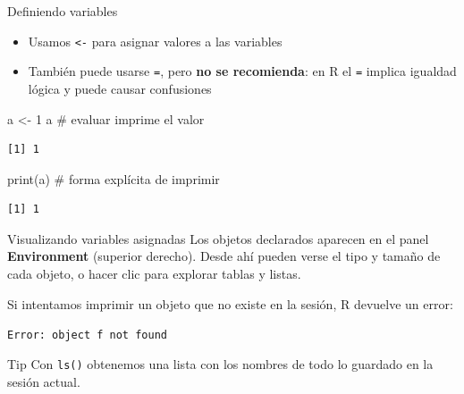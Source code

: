 \documentclass[
  9pt,
  ignorenonframetext,
]{beamer}
\newenvironment{Shaded}{\begin{snugshade}}{\end{snugshade}}
\newcommand{\CommentTok}[1]{\textcolor[rgb]{0.37,0.37,0.37}{#1}}
\newcommand{\DecValTok}[1]{\textcolor[rgb]{0.68,0.00,0.00}{#1}}
\newcommand{\FunctionTok}[1]{\textcolor[rgb]{0.28,0.35,0.67}{#1}}
\newcommand{\NormalTok}[1]{\textcolor[rgb]{0.00,0.23,0.31}{#1}}
\newcommand{\OtherTok}[1]{\textcolor[rgb]{0.00,0.23,0.31}{#1}}
\providecommand{\tightlist}{%
  \setlength{\itemsep}{0pt}\setlength{\parskip}{0pt}}\usepackage{longtable,booktabs,array}
\begin{document}
\begin{frame}[fragile]{Definiendo variables}
\label{definiendo-variables}
\begin{itemize}
\tightlist
\item
  Usamos \texttt{\textless{}-} para asignar valores a las variables
\item
  También puede usarse \texttt{=}, pero \textbf{no se recomienda}: en R
  el \texttt{=} implica igualdad lógica y puede causar confusiones
\end{itemize}

\begin{Shaded}
\begin{Highlighting}[]
\NormalTok{a }\OtherTok{\textless{}{-}} \DecValTok{1}
\NormalTok{a             }\CommentTok{\# evaluar imprime el valor}
\end{Highlighting}
\end{Shaded}

\begin{verbatim}
[1] 1
\end{verbatim}

\begin{Shaded}
\begin{Highlighting}[]
\FunctionTok{print}\NormalTok{(a)      }\CommentTok{\# forma explícita de imprimir}
\end{Highlighting}
\end{Shaded}

\begin{verbatim}
[1] 1
\end{verbatim}
\end{frame}

\begin{frame}[fragile]{Visualizando variables asignadas}
\label{visualizando-variables-asignadas}
Los objetos declarados aparecen en el panel \textbf{Environment}
(superior derecho). Desde ahí pueden verse el tipo y tamaño de cada
objeto, o hacer clic para explorar tablas y listas.

Si intentamos imprimir un objeto que no existe en la sesión, R devuelve
un error:

\texttt{Error:\ object\ \textquotesingle{}f\textquotesingle{}\ not\ found}

\begin{block}{Tip}
Con \texttt{ls()} obtenemos una lista con los nombres de todo lo guardado en la sesión actual.
\end{block}
\end{frame}
\end{document}
